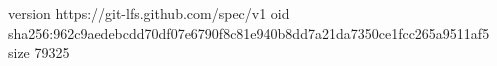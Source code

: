 version https://git-lfs.github.com/spec/v1
oid sha256:962c9aedebcdd70df07e6790f8c81e940b8dd7a21da7350ce1fcc265a9511af5
size 79325
